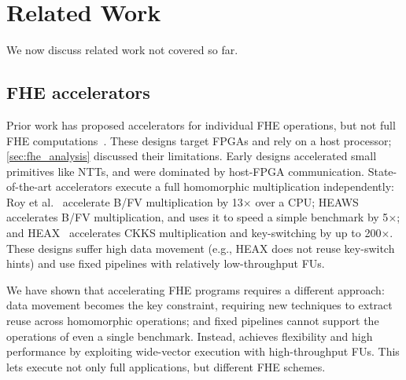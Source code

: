 \chapter{Related Work}
\label{sec:related}

We now discuss related work not covered so far.

\section{FHE accelerators}
Prior work has proposed accelerators for individual FHE operations, but not full FHE computations~\cite{cousins:hpec12:sipher-fpga,cousins:hpec14:fpga-he,cousins:tetc17:fpga-he,doroz:tc15:accelerating-fhe,roy:hpca19:fpga-he,mert:tvlsi20:bfv-accel,migliore:tecs17:he-karatsuba,riazi:asplos20:heax,turan:tc20:heaws,mert:tvlsi20:bfv-accel}.
These designs target FPGAs and rely on a host processor;
\autoref{sec:fhe_analysis} discussed their limitations.
Early designs accelerated small primitives like NTTs, and were dominated by host-FPGA communication.
State-of-the-art accelerators execute a full homomorphic multiplication independently:
Roy et al.~\cite{roy:hpca19:fpga-he} accelerate B/FV multiplication by 13$\times$ over a CPU;
HEAWS~\cite{turan:tc20:heaws} accelerates B/FV multiplication, and uses it to speed a simple 
benchmark by 5$\times$;
and HEAX~\cite{riazi:asplos20:heax} accelerates CKKS multiplication and key-switching by up to 200$\times$.
These designs suffer high data movement (e.g., HEAX does not reuse key-switch hints)
and use fixed pipelines with relatively low-throughput FUs.

We have shown that accelerating FHE programs requires a different approach:
data movement becomes the key constraint, requiring new techniques
to extract reuse {across} homomorphic operations;
and fixed pipelines cannot support the operations of even a single benchmark.
Instead, \name achieves flexibility and high performance by exploiting
wide-vector execution with high-throughput FUs.
This lets \name execute not only full applications, but different FHE schemes.


